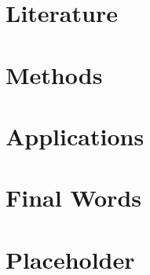 \documentclass[]{book}
\begin{document}
\chapter{Literature}\label{literature}

\chapter{Methods}\label{methods-1}

\chapter{Applications}\label{applications-1}

\chapter{Final Words}\label{final-words-1}

\chapter{Placeholder}\label{placeholder}


\end{document}
